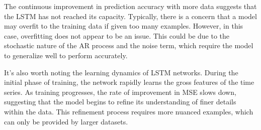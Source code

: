 The continuous improvement in prediction accuracy with more data suggests that the LSTM has not reached its capacity. Typically, there is a concern that a model may overfit to the training data if given too many examples.
However, in this case, overfitting does not appear to be an issue. This could be due to the stochastic nature of the AR process and the noise term, which require the model to generalize well to perform accurately.

It's also worth noting the learning dynamics of LSTM networks. During the initial phase of training, the network rapidly learns the gross features of the time series. As training progresses, the rate of improvement in MSE slows down, suggesting that the model begins to refine its understanding of finer details within the data. This refinement process requires more nuanced examples, which can only be provided by larger datasets.
\vspace{3mm}